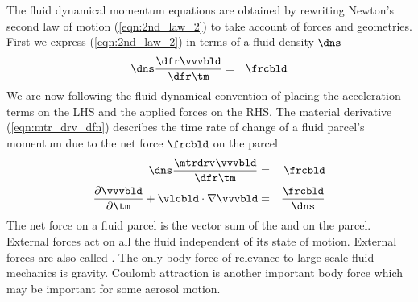 \documentclass[12pt,twoside]{book}
\begin{document}
The fluid dynamical momentum equations are obtained by rewriting 
Newton's second law of motion (\ref{eqn:2nd_law_2}) to take account of 
forces and geometries.
First we express (\ref{eqn:2nd_law_2}) in terms of a fluid density
$\dns$  
\begin{eqnarray}
\dns \frac{\dfr\vvvbld}{\dfr\tm} & = & \frcbld 
\label{eqn:2nd_law_3}
\end{eqnarray}
We are now following the fluid dynamical convention of placing the 
acceleration terms on the LHS and the applied forces on the RHS.
The material derivative (\ref{eqn:mtr_drv_dfn}) describes the time
rate of change of a fluid parcel's momentum due to the net force
$\frcbld$ on the parcel 
\begin{eqnarray}
\dns \frac{\mtrdrv \vvvbld}{\dfr\tm} & = & \frcbld \\
\frac{\partial \vvvbld}{\partial \tm} + \vlcbld \cdot \nabla \vvvbld 
& = & \frac{\frcbld}{\dns } 
\label{eqn:2nd_law_4}
\end{eqnarray}
The net force on a fluid parcel is the vector sum of the
 and  on the parcel.
External forces act on all the fluid independent of its state of
motion. 
External forces are also called .
The only body force of relevance to large scale fluid mechanics is
gravity. 
Coulomb attraction is another important body force which may be
important for some aerosol motion.
\end{document}
